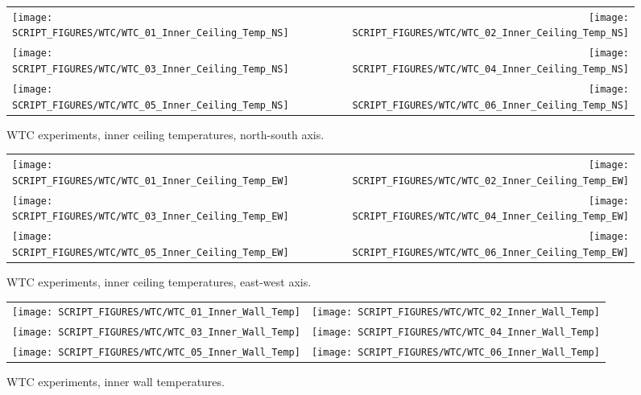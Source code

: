 \begin{figure}[p]
\begin{tabular*}{\textwidth}{l@{\extracolsep{\fill}}r}
\texttt{[image: SCRIPT\_FIGURES/WTC/WTC\_01\_Inner\_Ceiling\_Temp\_NS]} &
\texttt{[image: SCRIPT\_FIGURES/WTC/WTC\_02\_Inner\_Ceiling\_Temp\_NS]} \\
\texttt{[image: SCRIPT\_FIGURES/WTC/WTC\_03\_Inner\_Ceiling\_Temp\_NS]} &
\texttt{[image: SCRIPT\_FIGURES/WTC/WTC\_04\_Inner\_Ceiling\_Temp\_NS]} \\
\texttt{[image: SCRIPT\_FIGURES/WTC/WTC\_05\_Inner\_Ceiling\_Temp\_NS]} &
\texttt{[image: SCRIPT\_FIGURES/WTC/WTC\_06\_Inner\_Ceiling\_Temp\_NS]}
\end{tabular*}
\caption{WTC experiments, inner ceiling temperatures, north-south axis.}
\label{NIST_WTC_Inner_Ceiling_NS}
\end{figure}

\begin{figure}[p]
\begin{tabular*}{\textwidth}{l@{\extracolsep{\fill}}r}
\texttt{[image: SCRIPT\_FIGURES/WTC/WTC\_01\_Inner\_Ceiling\_Temp\_EW]} &
\texttt{[image: SCRIPT\_FIGURES/WTC/WTC\_02\_Inner\_Ceiling\_Temp\_EW]} \\
\texttt{[image: SCRIPT\_FIGURES/WTC/WTC\_03\_Inner\_Ceiling\_Temp\_EW]} &
\texttt{[image: SCRIPT\_FIGURES/WTC/WTC\_04\_Inner\_Ceiling\_Temp\_EW]} \\
\texttt{[image: SCRIPT\_FIGURES/WTC/WTC\_05\_Inner\_Ceiling\_Temp\_EW]} &
\texttt{[image: SCRIPT\_FIGURES/WTC/WTC\_06\_Inner\_Ceiling\_Temp\_EW]}
\end{tabular*}
\caption{WTC experiments, inner ceiling temperatures, east-west axis.}
\label{NIST_WTC_Inner_Ceiling_EW}
\end{figure}

\begin{figure}[p]
\begin{tabular*}{\textwidth}{l@{\extracolsep{\fill}}r}
\texttt{[image: SCRIPT\_FIGURES/WTC/WTC\_01\_Inner\_Wall\_Temp]} &
\texttt{[image: SCRIPT\_FIGURES/WTC/WTC\_02\_Inner\_Wall\_Temp]} \\
\texttt{[image: SCRIPT\_FIGURES/WTC/WTC\_03\_Inner\_Wall\_Temp]} &
\texttt{[image: SCRIPT\_FIGURES/WTC/WTC\_04\_Inner\_Wall\_Temp]} \\
\texttt{[image: SCRIPT\_FIGURES/WTC/WTC\_05\_Inner\_Wall\_Temp]} &
\texttt{[image: SCRIPT\_FIGURES/WTC/WTC\_06\_Inner\_Wall\_Temp]}
\end{tabular*}
\caption{WTC experiments, inner wall temperatures.}
\label{NIST_WTC_Inner_Wall}
\end{figure}


